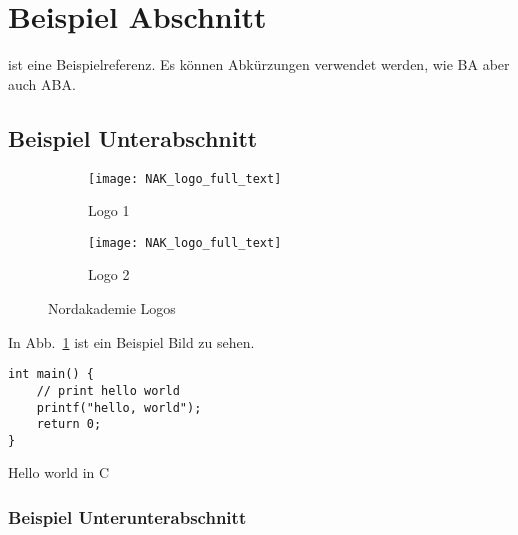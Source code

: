 \section{Beispiel Abschnitt}
\parencite{latex_companion} ist eine Beispielreferenz.
Es können Abkürzungen verwendet werden, wie \ac{BA} aber auch \ac{ABA}.

\subsection{Beispiel Unterabschnitt}

\begin{figure}[h]
    \centering

    \begin{subfigure}{.4\textwidth}
        \centering
        \texttt{[image: NAK\_logo\_full\_text]}
        \caption{Logo 1}
        \label{fig:subfig1}
    \end{subfigure}
    \begin{subfigure}{.4\textwidth}
        \centering
        \texttt{[image: NAK\_logo\_full\_text]}
        \caption{Logo 2}
        \label{fig:subfig2}
    \end{subfigure}

    \caption{Nordakademie Logos}
    \label{fig:fig}
\end{figure}

In Abb.~\ref{fig:subfig1} ist ein Beispiel Bild zu sehen.

\begin{listing}[H]
    \begin{verbatim}
int main() {
    // print hello world
    printf("hello, world");
    return 0;
}
    \end{verbatim}
    \caption{Hello world in C}
    \label{lst:listing}
\end{listing}

\subsubsection{Beispiel Unterunterabschnitt}

\Blindtext{}
